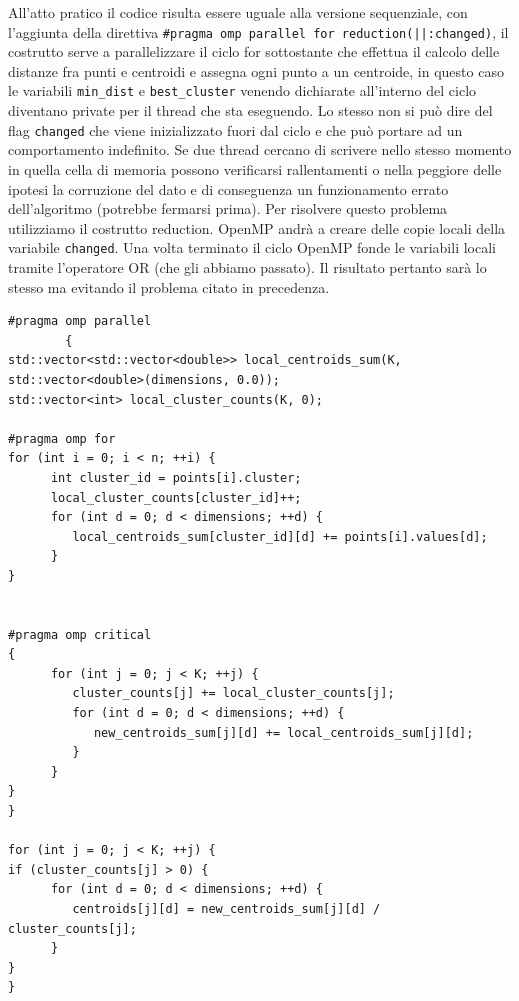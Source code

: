\documentclass[10pt,twocolumn,letterpaper]{article}
\begin{document}
All'atto pratico il codice risulta essere uguale alla versione sequenziale, con l'aggiunta della direttiva \lstinline{#pragma omp parallel for reduction(||:changed)}, il costrutto serve a parallelizzare il ciclo for sottostante che effettua il calcolo delle distanze fra punti e centroidi e assegna ogni punto a un centroide, in questo caso le variabili \lstinline{min_dist} e \lstinline{best_cluster} venendo dichiarate all'interno del ciclo diventano private per il thread che sta eseguendo. Lo stesso non si può dire del flag \lstinline{changed} che viene inizializzato fuori dal ciclo e che può portare ad un comportamento indefinito. Se due thread cercano di scrivere nello stesso momento in quella cella di memoria possono verificarsi rallentamenti o nella peggiore delle ipotesi la corruzione del dato e di conseguenza un funzionamento errato dell'algoritmo (potrebbe fermarsi prima). Per risolvere questo problema utilizziamo il costrutto reduction. OpenMP andrà a creare delle copie locali della variabile \lstinline{changed}. Una volta terminato il ciclo OpenMP fonde le variabili locali tramite l'operatore OR (che gli abbiamo passato). Il risultato pertanto sarà lo stesso ma evitando il problema citato in precedenza.


\begin{lstlisting}[caption={Fase di aggioramento dei centroidi parallela AoS}, label={lst:openmp}]
#pragma omp parallel
        {
std::vector<std::vector<double>> local_centroids_sum(K, std::vector<double>(dimensions, 0.0));
std::vector<int> local_cluster_counts(K, 0);

#pragma omp for
for (int i = 0; i < n; ++i) {
      int cluster_id = points[i].cluster;
      local_cluster_counts[cluster_id]++;
      for (int d = 0; d < dimensions; ++d) {
         local_centroids_sum[cluster_id][d] += points[i].values[d];
      }
}


#pragma omp critical
{
      for (int j = 0; j < K; ++j) {
         cluster_counts[j] += local_cluster_counts[j];
         for (int d = 0; d < dimensions; ++d) {
            new_centroids_sum[j][d] += local_centroids_sum[j][d];
         }
      }
}
} 

for (int j = 0; j < K; ++j) {
if (cluster_counts[j] > 0) {
      for (int d = 0; d < dimensions; ++d) {
         centroids[j][d] = new_centroids_sum[j][d] / cluster_counts[j];
      }
}
}
\end{lstlisting}
\end{document}
